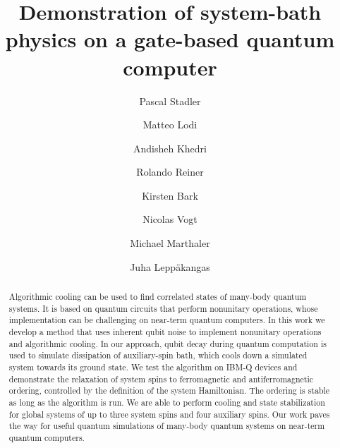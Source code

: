 \documentclass[twocolumn,amsmath,amssymb,pra]{revtex4-2}
\begin{document}
\pacs{}

\title{Demonstration of system-bath physics on a gate-based quantum computer}
\author{Pascal Stadler}
\author{Matteo Lodi}
\author{Andisheh Khedri}
\author{Rolando Reiner}
\author{Kirsten Bark}
\author{Nicolas Vogt}
\author{Michael Marthaler}
\author{Juha Leppäkangas}







\begin{abstract}
Algorithmic cooling can be used to find correlated states of many-body quantum systems. %
It is based on quantum circuits that perform nonunitary operations, whose implementation can be challenging on near-term quantum computers.
In this work we develop a method that uses inherent qubit noise to implement nonunitary operations and algorithmic cooling.
In our approach, qubit decay during quantum computation is used to simulate dissipation of auxiliary-spin bath,
which cools down a simulated system towards its ground state.
We test the algorithm on IBM-Q devices and demonstrate the relaxation of system spins to ferromagnetic and antiferromagnetic ordering,
controlled by the definition of the system Hamiltonian. The ordering is stable as long as the algorithm is run.
We are able to perform cooling and state stabilization for global systems of up to three system spins and four auxiliary spins.
Our work paves the way for useful quantum simulations of many-body quantum systems on near-term quantum computers.
\end{abstract}






\maketitle
\end{document}
